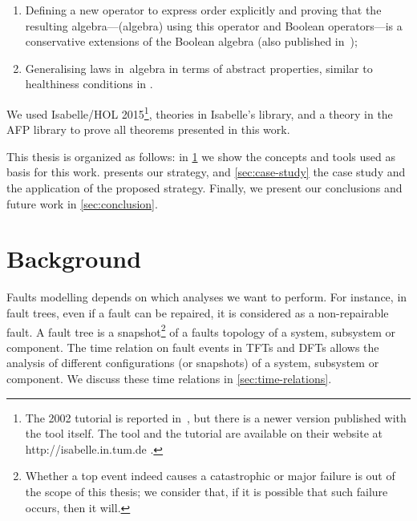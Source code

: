 \documentclass[en,twoside,onehalfspacing,phd]{risethesis}
\makeatletter
\newcommand{\todo}[1]{\@latex@warning{TODO #1}}
\makeatother
\begin{document}
\begin{enumerate}
  \item Defining a new operator to express order explicitly and proving that the resulting algebra---(\ac{algebra}) using this operator and Boolean operators---is a conservative extensions of the Boolean algebra (also published in~\cite{DM2016});
  \item Generalising laws in~\ac{algebra} in terms of abstract properties, similar to healthiness conditions in .
\end{enumerate}

We used Isabelle/HOL 2015\footnote{The 2002 tutorial is reported in~\cite{NPW2002}, but there is a newer version published with the tool itself.
The tool and the tutorial are available on their website at http://isabelle.in.tum.de .}, theories in Isabelle's library, and a theory in the AFP library \cite{JM2005} to prove all theorems presented in this work.

This thesis is organized as follows: in \cref{chap:background} we show the concepts and tools used as basis for this work.
 presents our strategy, and \cref{sec:case-study} the case study and the application of the proposed strategy.
Finally, we present our conclusions and future work in \cref{sec:conclusion}.

\chapter{Background}
\label{chap:background}

Faults modelling depends on which analyses we want to perform.
For instance, in fault trees, even if a fault can be repaired, it is considered as a non-repairable fault.
A fault tree is a snapshot\footnote{Whether a top event indeed causes a catastrophic or major failure is out of the scope of this thesis; we consider that, if it is possible that such failure occurs, then it will.} of a faults topology of a system, subsystem or component.
The time relation on fault events in \acp{TFT} and \acp{DFT} allows the analysis of different configurations (or snapshots) of a system, subsystem or component.
We discuss these time relations in \cref{sec:time-relations}.
\end{document}

